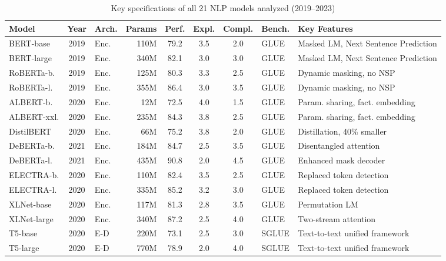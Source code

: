 \documentclass[preprint,12pt]{elsarticle}
\begin{document}
\begin{table}[ht!]
\centering
\caption{Key specifications of all 21 NLP models analyzed (2019--2023)}
\label{tab:models_overview}
\scriptsize %
\setlength{\tabcolsep}{2pt} %

\begin{tabularx}{\textwidth}{@{} l c l r c c c l L @{}}
\toprule
\textbf{Model} & \textbf{Year} & \textbf{Arch.} & \textbf{Params} & \textbf{Perf.} & \textbf{Expl.} & \textbf{Compl.} & \textbf{Bench.} & \textbf{Key Features} \\
\midrule
BERT-base & 2019 & Enc. & 110M & 79.2 & 3.5 & 2.0 & GLUE & Masked LM, Next Sentence Prediction \\
BERT-large & 2019 & Enc. & 340M & 82.1 & 3.0 & 3.0 & GLUE & Masked LM, Next Sentence Prediction \\
RoBERTa-b. & 2019 & Enc. & 125M & 80.3 & 3.3 & 2.5 & GLUE & Dynamic masking, no NSP \\
RoBERTa-l. & 2019 & Enc. & 355M & 86.4 & 3.0 & 3.5 & GLUE & Dynamic masking, no NSP \\
ALBERT-b. & 2020 & Enc. & 12M & 72.5 & 4.0 & 1.5 & GLUE & Param. sharing, fact. embedding \\
ALBERT-xxl. & 2020 & Enc. & 235M & 84.3 & 3.8 & 2.5 & GLUE & Param. sharing, fact. embedding \\
DistilBERT & 2020 & Enc. & 66M & 75.2 & 3.8 & 2.0 & GLUE & Distillation, 40\% smaller \\
DeBERTa-b. & 2021 & Enc. & 184M & 84.7 & 2.5 & 3.5 & GLUE & Disentangled attention \\
DeBERTa-l. & 2021 & Enc. & 435M & 90.8 & 2.0 & 4.5 & GLUE & Enhanced mask decoder \\
ELECTRA-b. & 2020 & Enc. & 110M & 82.4 & 3.5 & 2.5 & GLUE & Replaced token detection \\
ELECTRA-l. & 2020 & Enc. & 335M & 85.2 & 3.2 & 3.0 & GLUE & Replaced token detection \\
XLNet-base & 2020 & Enc. & 117M & 81.3 & 2.8 & 3.5 & GLUE & Permutation LM \\
XLNet-large & 2020 & Enc. & 340M & 87.2 & 2.5 & 4.0 & GLUE & Two-stream attention \\
T5-base & 2020 & E-D & 220M & 73.1 & 2.5 & 3.0 & SGLUE & Text-to-text unified framework \\
T5-large & 2020 & E-D & 770M & 78.9 & 2.0 & 4.0 & SGLUE & Text-to-text unified framework \\

\end{tabularx}
\end{table}
\end{document}
